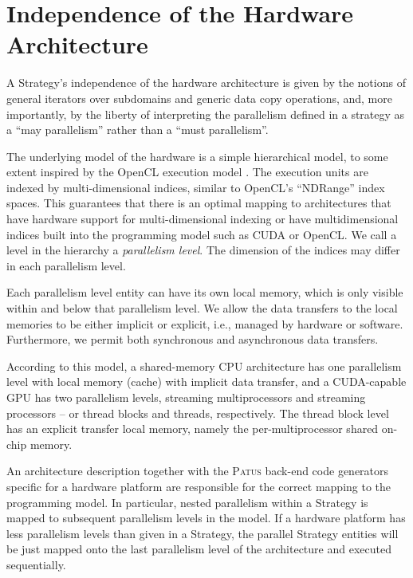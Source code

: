 \section{Independence of the Hardware Architecture}
\label{sec:hardwaremodel}

A Strategy's independence of the hardware architecture is given by the notions of general iterators
over subdomains and generic data copy operations, and, more importantly, by the liberty of interpreting
the parallelism defined in a strategy as a ``may parallelism'' rather than a ``must parallelism''.

The underlying model of the hardware is a simple hierarchical model, to some extent inspired by the
OpenCL execution model \cite{opencl08}. The execution units are indexed by multi-dimensional indices,
similar to OpenCL's ``NDRange'' index spaces.
This guarantees that there is an optimal mapping to architectures that have hardware support for multi-dimensional indexing or have
multidimensional indices built into the programming model such as CUDA or OpenCL.
We call a level in the hierarchy a {\em parallelism level}.
The dimension of the indices may differ in each parallelism level.

Each parallelism level entity can have its own local memory, which is only visible within and below that parallelism level.
We allow the data transfers to the local memories to be either implicit or explicit, i.e., managed by hardware or software.
Furthermore, we permit both synchronous and asynchronous data transfers.

According to this model, a shared-memory CPU architecture has one parallelism level with local memory (cache) with
implicit data transfer, and a CUDA-capable GPU has two parallelism levels, streaming multiprocessors and streaming
processors -- or thread blocks and threads, respectively. The thread block level has an explicit transfer local memory,
namely the per-multiprocessor shared on-chip memory.

An architecture description together with the \textsc{Patus} back-end code generators specific for a hardware platform
are responsible for the correct mapping to the programming model.
In particular, nested parallelism within a Strategy is mapped to subsequent parallelism levels in the model.
If a hardware platform has less parallelism levels than given in a Strategy, the parallel Strategy entities will be
just mapped onto the last parallelism level of the architecture and executed sequentially.

